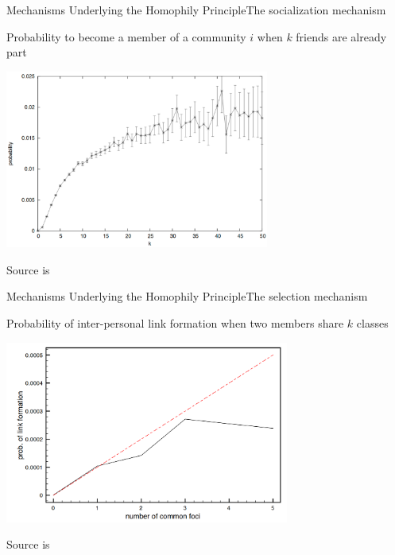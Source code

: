 \documentclass[notes, aspectratio=1610]{beamer}
\begin{document}
\begin{frame}{Mechanisms Underlying the Homophily Principle}{The socialization mechanism}
	\centering 

	\small Probability to become a member of a community $i$ when $k$ friends 
	are already part

	\includegraphics[width=0.65\textwidth]{images/membership_closure.png}

	\footnotesize Source is \cite{kossinets2009}
\end{frame}

\begin{frame}{Mechanisms Underlying the Homophily Principle}{The selection mechanism}
	\centering 

	\small Probability of inter-personal link formation when two members 
	share $k$ classes

	\includegraphics[width=0.7\textwidth]{images/focal_closure.png}

	\footnotesize Source is \cite{kossinets2009}
\end{frame}
\end{document}
